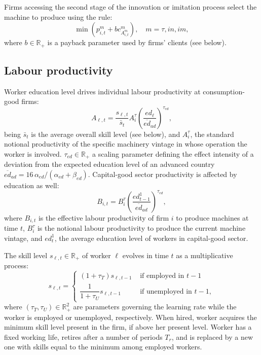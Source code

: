\documentclass[a4paper,11pt]{article}
\begin{document}
\begin{appendices}
Firms accessing the second stage of the innovation or imitation process select the machine to produce using the rule:
\begin{equation}
	\min \left( p_{i,t}^m + bc_{A_{i,t}^m}^m \right), \quad m = \tau, in, im,
\end{equation}
where $b \in \mathbb{R}_+$ is a payback parameter used by firms' clients (see below).


\subsection*{Labour productivity}

Worker education level drives individual labour productivity at consumption-good firms:
\begin{equation}
	A_{\ell,t} = \frac{s_{\ell,t}}{\bar{s}_t} A_i^\tau \left( \frac{ {ed}_\ell }{ {\overline{ed}_{ad}} } \right)^{\tau_{ed}},
	\label{prod2}
\end{equation}
being $\bar{s}_t$ is the average overall skill level (see below), and $A_i^\tau$, the standard notional productivity of the specific machinery vintage in whose operation the worker is involved. $\tau_{ed} \in \mathbb{R}_+$ a scaling parameter defining the effect intensity of a deviation from the expected education level of an advanced country $\overline{ed}_{ad} = 16 \, \alpha_{ed} / \left( \alpha_{ed} + \beta_{ed} \right)$. Capital-good sector productivity is affected by education as well:
\begin{equation}
	B_{i,t} = B_i^\tau \left( \frac{ {ed}_{t-1}^1 }{ {\overline{ed}_{ad}} } \right)^{\tau_{ed}},
	\label{prod1}
\end{equation}
where $B_{i,t}$ is the effective labour productivity of firm $i$ to produce machines at time $t$, $B_i^\tau$ is the notional labour productivity to produce the current machine vintage, and ${ed}_t^1$, the average education level of workers in capital-good sector.

The skill level $s_{\ell,t} \in \mathbb{R}_+$ of worker $\ell$ evolves in time $t$ as a multiplicative process:
\begin{equation}
	s_{\ell,t} =
	\begin{cases}
		( 1 + \tau_T ) s_{\ell,t-1} & \mbox{ if employed in } t-1 \\
		\dfrac{1}{ 1 + \tau_U } s_{\ell,t-1} & \mbox{ if unemployed in } t-1,
	\end{cases}
	\label{eq:skills}
\end{equation}
where $(\tau_T, \tau_U) \in \mathbb{R}^2_+$ are parameters governing the learning rate while the worker is employed or unemployed, respectively. When hired, worker acquires the minimum skill level present in the firm, if above her present level. Worker has a fixed working life, retires after a number of periods $T_r$, and is replaced by a new one with skills equal to the minimum among employed workers.


\end{appendices}
\end{document}
